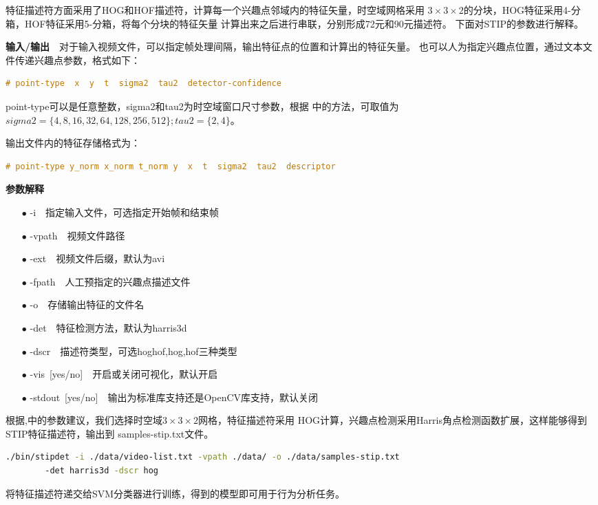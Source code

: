 特征描述符方面采用了HOG和HOF描述符，计算每一个兴趣点邻域内的特征矢量，时空域网格采用
$3\times3\times2$的分块，HOG特征采用4-分箱，HOF特征采用5-分箱，将每个分块的特征矢量
计算出来之后进行串联，分别形成72元和90元描述符。
下面对STIP的参数进行解释。

\textbf{输入/输出}~~对于输入视频文件，可以指定帧处理间隔，输出特征点的位置和计算出的特征矢量。
也可以人为指定兴趣点位置，通过文本文件传递兴趣点参数，格式如下：
\begin{lstlisting}[language=C]
# point-type  x  y  t  sigma2  tau2  detector-confidence
\end{lstlisting}
\textsf{point-type}可以是任意整数，\textsf{sigma2}和\textsf{tau2}为时空域窗口尺寸参数，根据
\cite{stip}中的方法，可取值为$sigma2=\{4,8,16,32,64,128,256,512\};tau2=\{2,4\}$。

输出文件内的特征存储格式为：
\begin{lstlisting}[language=C]
# point-type y_norm x_norm t_norm y  x  t  sigma2  tau2  descriptor
\end{lstlisting}

\textbf{参数解释}~~
\begin{enumerate}
    \item[$\bullet$]\textsf{-i}~~指定输入文件，可选指定开始帧和结束帧
    \item[$\bullet$]\textsf{-vpath}~~视频文件路径
    \item[$\bullet$]\textsf{-ext}~~视频文件后缀，默认为\textsf{avi}
    \item[$\bullet$]\textsf{-fpath}~~人工预指定的兴趣点描述文件
    \item[$\bullet$]\textsf{-o}~~存储输出特征的文件名
    \item[$\bullet$]\textsf{-det}~~特征检测方法，默认为\textsf{harris3d}\cite{ostip}
    \item[$\bullet$]\textsf{-dscr}~~描述符类型，可选\textsf{hoghof,hog,hof}三种类型
    \item[$\bullet$]\textsf{-vis~[yes/no]}~~开启或关闭可视化，默认开启
    \item[$\bullet$]\textsf{-stdout~[yes/no]}~~输出为标准库支持还是OpenCV库支持，默认关闭
\end{enumerate}

根据\cite{ostip},\cite{stip}中的参数建议，我们选择时空域$3\times3\times2$网格，特征描述符采用
HOG计算，兴趣点检测采用Harris角点检测函数扩展，这样能够得到STIP特征描述符，输出到
\textsf{samples-stip.txt}文件。
\begin{lstlisting}[language=bash]
./bin/stipdet -i ./data/video-list.txt -vpath ./data/ -o ./data/samples-stip.txt 
        -det harris3d -dscr hog
\end{lstlisting}
将特征描述符递交给SVM分类器进行训练，得到的模型即可用于行为分析任务。


